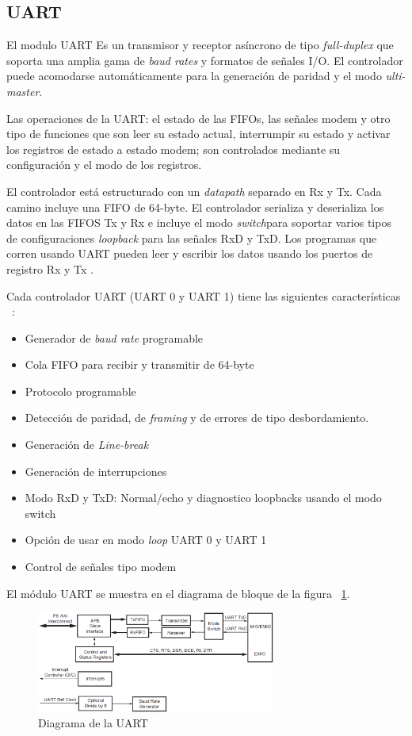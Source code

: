 \documentclass[a4paper,openright,12pt]{report}
\begin{document}
\subsection{UART}

El modulo UART Es un transmisor y receptor asíncrono de tipo \textit{full-duplex} que soporta una amplia gama de \textit{baud rates} y formatos de señales I/O. El controlador puede acomodarse automáticamente para la generación de paridad y el modo \textit{ulti-master}.

Las operaciones de la UART:  el estado de las FIFOs, las señales modem y otro tipo de funciones que son leer su estado actual, interrumpir su estado y activar los registros de estado a estado modem; son controlados mediante su configuración y el modo de los registros.

El controlador está estructurado con un \textit{datapath} separado en Rx y Tx. Cada camino incluye una FIFO de 64-byte. El controlador serializa y deserializa los datos en  las FIFOS Tx y Rx e incluye el modo \textit{switch}para soportar varios tipos de configuraciones \textit{loopback} para las señales RxD y TxD. Los programas que corren usando UART pueden leer y escribir los datos usando los puertos de registro Rx y Tx .  

Cada controlador UART  (UART 0 y  UART 1) tiene las siguientes características ~\cite{UART}:

\begin{itemize}
\item Generador de \textit{baud rate} programable
\item Cola FIFO para recibir y transmitir de 64-byte	
\item Protocolo programable
\item Detección de paridad, de \textit{framing} y de errores de tipo desbordamiento.
\item Generación de \textit{Line-break}
\item Generación de interrupciones
\item Modo RxD y TxD: Normal/echo y diagnostico loopbacks usando el modo switch
\item Opción de usar en modo \textit{loop} UART 0 y UART 1
\item Control de señales  tipo modem
\end{itemize}

El módulo UART se muestra en el diagrama de bloque de la figura ~\ref{UART}.
\begin{figure}[H]
	\centering
	\includegraphics[width=0.70\textwidth]{img/uart.png}
	\caption{Diagrama de la UART}
	\label{UART}
\end{figure}
\end{document}
